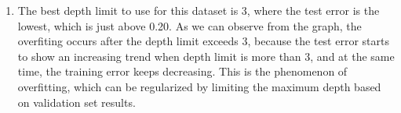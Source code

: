 \documentclass[11pt]{article}
\begin{document}
\begin{enumerate}[label=(\alph*)]
    \item 
    The best depth limit to use for this dataset is 3, where the test error is the lowest, which is just above 0.20. As we can observe from the graph, the overfiting occurs after the depth limit exceeds 3, because the test error starts to show an increasing trend when depth limit is more than 3, and at the same time, the training error keeps decreasing. This is the phenomenon of overfitting, which can be regularized by limiting the maximum depth based on validation set results.
    \\
    \newpage


\end{enumerate}
\end{document}

